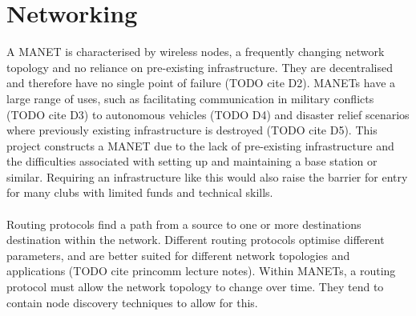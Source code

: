 \documentclass[12pt,a4paper]{report}
\begin{document}
\section{Networking}
A MANET is characterised by wireless nodes, a frequently changing network topology and no reliance on pre-existing infrastructure. They are decentralised and therefore have no single point of failure (TODO cite D2). MANETs have a large range of uses, such as facilitating communication in military conflicts (TODO cite D3) to autonomous vehicles (TODO D4) and disaster relief scenarios where previously existing infrastructure is destroyed (TODO cite D5). This project constructs a MANET due to the lack of pre-existing infrastructure and the difficulties associated with setting up and maintaining a base station or similar. Requiring an infrastructure like this would also raise the barrier for entry for many clubs with limited funds and technical skills. \\ \\
Routing protocols find a path from a source to one or more destinations destination within the network. Different routing protocols optimise different parameters, and are better suited for different network topologies and applications (TODO cite princomm lecture notes). Within MANETs, a routing protocol must allow the network topology to change over time. They tend to contain node discovery techniques to allow for this. %

\end{document}
